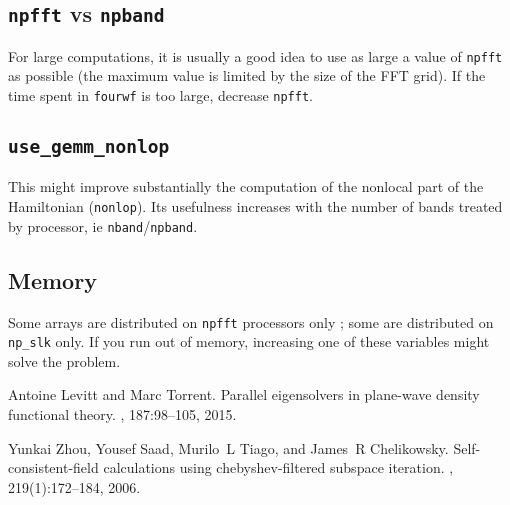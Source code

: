 \documentclass[11pt]{article}
\begin{document}
\subsection{\texttt{npfft} vs \texttt{npband}}
For large computations, it is usually a good idea to use as large a
value of \texttt{npfft} as possible (the maximum value is limited by
the size of the FFT grid). If the time spent in \texttt{fourwf} is too
large, decrease \texttt{npfft}.
\subsection{\texttt{use\_gemm\_nonlop}}
This might improve substantially the computation of the nonlocal part
of the Hamiltonian (\texttt{nonlop}). Its usefulness increases with
the number of bands treated by processor, ie
\texttt{nband}/\texttt{npband}.
\subsection{Memory}
Some arrays are distributed on \texttt{npfft} processors only ; some
are distributed on \texttt{np\_slk} only. If you run out of memory,
increasing one of these variables might solve the problem.

\begin{thebibliography}{ZSTC06}

Antoine Levitt and Marc Torrent.
\newblock Parallel eigensolvers in plane-wave density functional theory.
, 187:98--105, 2015.

Yunkai Zhou, Yousef Saad, Murilo~L Tiago, and James~R Chelikowsky.
\newblock Self-consistent-field calculations using chebyshev-filtered subspace
  iteration.
, 219(1):172--184, 2006.

\end{thebibliography}
% 
% 
\end{document}
